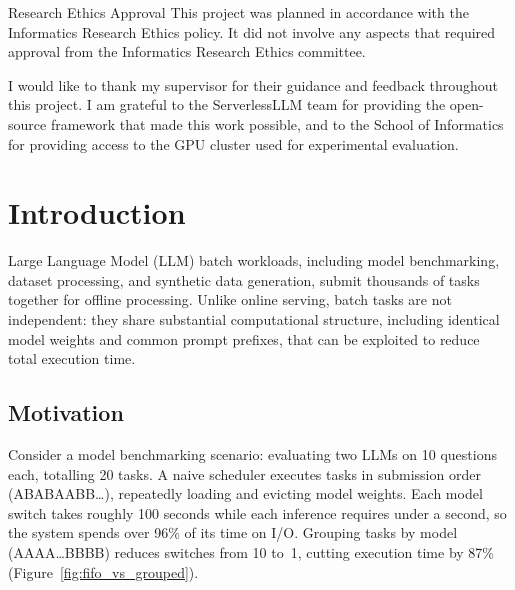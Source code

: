 \documentclass[logo,bsc,singlespacing,parskip,online]{infthesis}
\begin{document}
\begin{preliminary}
\newenvironment{ethics}
   {\begin{frontenv}{Research Ethics Approval}{\LARGE}}
   {\end{frontenv}\newpage}

\begin{ethics}
This project was planned in accordance with the Informatics Research
Ethics policy. It did not involve any aspects that required approval
from the Informatics Research Ethics committee.
\end{ethics}

\standarddeclaration

\begin{acknowledgements}
I would like to thank my supervisor for their guidance and feedback throughout this project. I am grateful to the ServerlessLLM team for providing the open-source framework that made this work possible, and to the School of Informatics for providing access to the GPU cluster used for experimental evaluation.
\end{acknowledgements}

\tableofcontents

\end{preliminary}


\chapter{Introduction}

Large Language Model (LLM) batch workloads, including model benchmarking, dataset processing, and synthetic data generation, submit thousands of tasks together for offline processing. Unlike online serving, batch tasks are not independent: they share substantial computational structure, including identical model weights and common prompt prefixes, that can be exploited to reduce total execution time.

\section{Motivation}

Consider a model benchmarking scenario: evaluating two LLMs on 10 questions each, totalling 20 tasks. A naive scheduler executes tasks in submission order (ABABAABB\ldots), repeatedly loading and evicting model weights. Each model switch takes roughly 100 seconds while each inference requires under a second, so the system spends over 96\% of its time on I/O. Grouping tasks by model (AAAA\ldots BBBB) reduces switches from 10 to~1, cutting execution time by 87\% (Figure~\ref{fig:fifo_vs_grouped}).
\end{document}
